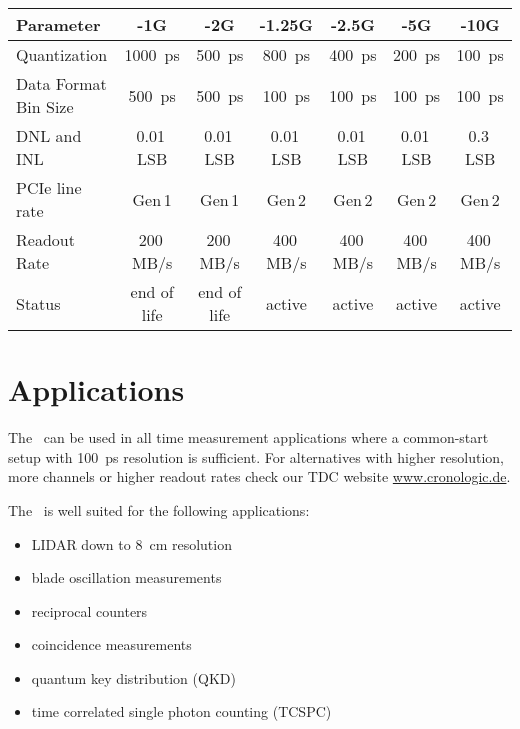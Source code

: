 \noindent
\begin{tabularx}{\textwidth}{|X|c|c|c|c|c|c|}
    \hline
    Parameter & -1G & -2G & -1.25G & -2.5G & -5G & -10G\\
    \hline\hline
    Quantization & \SI{1000}{\pico\second} & \SI{500}{\pico\second} & \SI{800}{\pico\second} & \SI{400}{\pico\second} & \SI{200}{\pico\second} & \SI{100}{\pico\second} \\
    \hline
    Data Format Bin Size & \SI{500}{\pico\second} & \SI{500}{\pico\second} & \SI{100}{\pico\second} & \SI{100}{\pico\second} & \SI{100}{\pico\second} & \SI{100}{\pico\second} \\
    \hline 
    DNL and INL & 0.01\,LSB & 0.01\,LSB & 0.01\,LSB & 0.01\,LSB & 0.01\,LSB & 0.3\,LSB \\
    \hline 
    PCIe line rate & Gen\,1 & Gen\,1 & Gen\,2 & Gen\,2 & Gen\,2 & Gen\,2\\  
    \hline 
    Readout Rate & 200\,MB/s & 200\,MB/s & 400\,MB/s & 400\,MB/s & 400\,MB/s & 400\,MB/s\\ 
    \hline 
    Status & end of life & end of life & active & active & active & active \\
    \hline
\end{tabularx}  

\section{Applications}
The \deviceName\  can be used in all time measurement applications where
a common-start setup with \SI{100}{\pico\second} resolution is sufficient. 
For alternatives with higher resolution, more channels or higher readout
rates check our TDC website
\href{https://www.cronologic.de/produkte/products-overview#tdcdata}{www.cronologic.de}.

The \deviceName\ is well suited for the following applications:
\begin{itemize}
    \item LIDAR down to \SI{8}{\centi\meter} resolution
    \item blade oscillation measurements
    \item reciprocal counters
    \item coincidence measurements
    \item quantum key distribution (QKD)
    \item time correlated single photon counting (TCSPC)
\end{itemize} 
